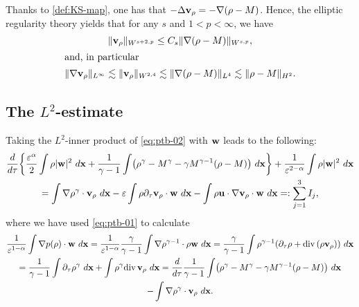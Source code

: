 \documentclass[11pt]{article}
\theoremstyle{plain}
\theoremstyle{definition}
\theoremstyle{remark}
\newcommand{\dtau}{\partial_\tau}
\newcommand{\dv}{\mathrm{div}\, }
\renewcommand{\vec}[1]{{\bf #1}}
\newcommand{\idx}{\ d\vec x}
\newcommand{\norm}[2]{\Vert #1 \Vert_{#2}}
\numberwithin{equation}{section}
\begin{document}
Thanks to \eqref{def:KS-map}, one has that  $ - \Delta \vec v_\rho = - \nabla(\rho - M) $. Hence, the elliptic regularity theory yields that
for any $ s $ and $ 1 < p < \infty $, we have
\begin{gather}
    \label{est:KS-map}
    \norm{\vec v_\rho}{W^{s+2,p}} \leq C_s \norm{\nabla (\rho - M)}{W^{s,p}}, \\
    \intertext{and, in particular} 
    \label{est:KS-map-2}
    \norm{\nabla \vec v_\rho}{L^\infty} \lesssim \norm{\vec v_\rho}{W^{2,4}} \lesssim \norm{\nabla (\rho - M)}{L^{4}} \lesssim \norm{\rho - M}{H^2}.
\end{gather}


\subsection{The $ L^2 $-estimate}\label{sec:l2-energy}
Taking the $ L^2 $-inner product of \eqref{eq:ptb-02} with $ \vec w $ leads to the following:
\begin{equation}
    \label{est:001}
    \begin{gathered}
        \dfrac{d}{d\tau} \biggl\lbrace \frac{\varepsilon^\alpha}{2} \int \rho \vert \vec w \vert^2 \idx  %
        + \frac{1}{\gamma-1} \int \bigl(\rho^\gamma - M^\gamma - \gamma M^{\gamma-1}(\rho - M) \bigr)  \idx \biggr\rbrace + \frac{1}{\varepsilon^{2-\alpha}} \int \rho \vert \vec w \vert^2 \idx \\ =   \int \nabla \rho^\gamma \cdot \vec v_\rho  \idx 
        - \varepsilon \int \rho \dtau \vec v_\rho \cdot \vec w \idx  -\int \rho \vec u \cdot \nabla \vec v_\rho \cdot \vec w \idx =: \sum_{j = 1}^3 I_j,
    \end{gathered}
\end{equation}
where we have used \eqref{eq:ptb-01} to calculate
\begin{equation}
    \label{est:002}
    \begin{gathered}
    \frac{1}{\varepsilon^{1-\alpha}} \int \nabla p(\rho) \cdot \vec w \idx = \frac{1}{\varepsilon^{1-\alpha}} \frac{\gamma}{\gamma-1} \int \nabla \rho^{\gamma-1} \cdot \rho \vec w \idx = \frac{\gamma}{\gamma-1} \int \rho^{\gamma-1} (\dtau \rho + \dv(\rho \vec v_\rho)) \idx \\
    = \frac{1}{\gamma-1} \int \dtau \rho^\gamma \idx + \int \rho^\gamma \dv \vec v_\rho \idx = \dfrac{d}{d\tau} \frac{1}{\gamma-1} \int  \bigl(\rho^\gamma - M^\gamma - \gamma M^{\gamma-1}(\rho - M) \bigr)   \idx \\
    - \int \nabla \rho^\gamma \cdot \vec v_\rho \idx.
\end{gathered}
\end{equation}
\end{document}

